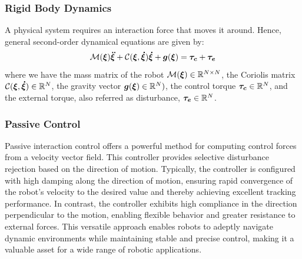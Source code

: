 \subsubsection{Rigid Body Dynamics}
A physical system requires an interaction force that moves it around. Hence, general second-order dynamical equations are given by:
\begin{equation}
\matd{M}(\vecs\xi)\vecs{\ddot\xi} + \matd{C}(\vecs\xi, \vecs{\dot\xi})\vecs{\dot\xi} + \vect g(\vecs\xi) = \vecs{\tau_c} + \vecs{\tau_e}
 \label{eq:robot_dynamics}
\end{equation}
where we have the mass matrix of the robot $\mathcal{M}(\boldsymbol{\xi}) \in \mathbb{R}^{N \times N}$, the Coriolis matrix $\mathcal{C}(\boldsymbol{\xi},\boldsymbol{\dot\xi}) \in \mathbb{R}^N$, the gravity vector $\boldsymbol{g}(\boldsymbol{\xi}) \in \mathbb{R}^N)$, the control torque $\boldsymbol{\tau_c} \in \mathbb{R}^N$, and the external torque, also referred as disturbance, $\boldsymbol{\tau_e} \in \mathbb{R}^N$.

\subsubsection{Passive Control}
Passive interaction control \cite{kronander2015passive} offers a powerful method for computing control forces from a velocity vector field. This controller provides selective disturbance rejection based on the direction of motion. Typically, the controller is configured with high damping along the direction of motion, ensuring rapid convergence of the robot's velocity to the desired value and thereby achieving excellent tracking performance. In contrast, the controller exhibits high compliance in the direction perpendicular to the motion, enabling flexible behavior and greater resistance to external forces. This versatile approach enables robots to adeptly navigate dynamic environments while maintaining stable and precise control, making it a valuable asset for a wide range of robotic applications.

